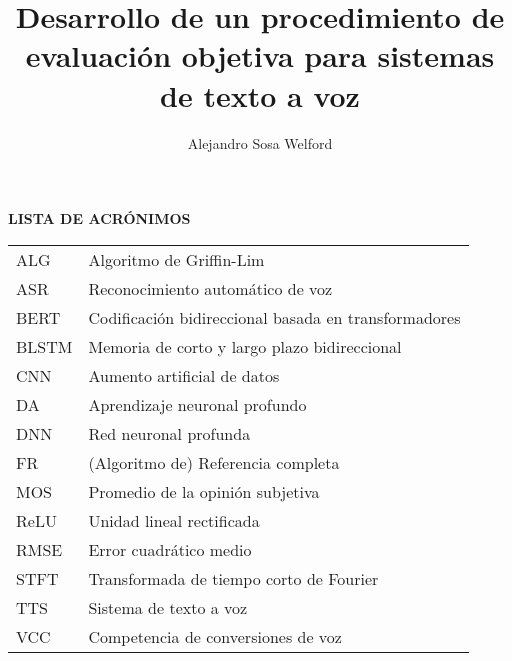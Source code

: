 \documentclass[12pt]{article}[A4]
\title{Desarrollo de un procedimiento de evaluación objetiva para sistemas de texto a voz
}
\author{Alejandro Sosa Welford}
\begin{document}



%
\newpage
\setcounter{section}{0}

\pagestyle{fancy}

\fancyhead{}
\fancyfoot{}
\renewcommand{\headrulewidth}{0pt}

\fancyfoot[R]{\thepage}



\setcounter{page}{1}
\tableofcontents
\newpage
\listoffigures
\newpage
\listoftables
\newpage
\Large \textbf{LISTA DE ACRÓNIMOS}

\begin{table}[H]
\begin{tabular}{l|l}
ALG   & Algoritmo de Griffin-Lim                             \\
ASR   & Reconocimiento automático de voz                     \\
BERT  & Codificación bidireccional basada en transformadores \\
BLSTM & Memoria de corto y largo plazo bidireccional         \\
CNN   & Aumento artificial de datos                          \\
DA    & Aprendizaje neuronal profundo                        \\
DNN   & Red neuronal profunda                                \\
FR    & (Algoritmo de) Referencia completa                   \\
MOS   & Promedio de la opinión subjetiva                     \\
ReLU  & Unidad lineal rectificada                            \\
RMSE  & Error cuadrático medio                               \\
STFT  & Transformada de tiempo corto de Fourier              \\
TTS   & Sistema de texto a voz                               \\
VCC   & Competencia de conversiones de voz                  
\end{tabular}
\end{table}
\end{document}

